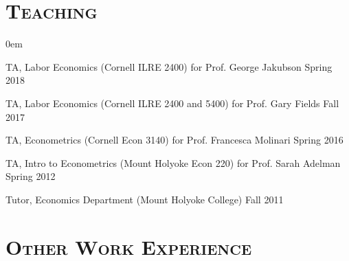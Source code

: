 \documentclass[10pt,letterpaper]{article}
\renewenvironment{itemize}{
  \begin{list}{}{
    \setlength{\leftmargin}{1.5em}
    \setlength{\itemsep}{0.25em}
    \setlength{\parskip}{0pt}
    \setlength{\parsep}{0.25em}
  }
}{
  \end{list}
}
\begin{document}
\section*{\scshape Teaching}
\begin{itemize} 
\itemsep0em
  \item TA, Labor Economics (Cornell ILRE 2400) for Prof. George Jakubson \hfill Spring 2018
  \item TA, Labor Economics (Cornell ILRE 2400 and 5400) for Prof. Gary Fields \hfill Fall 2017
  \item TA, Econometrics (Cornell Econ 3140) for Prof. Francesca Molinari \hfill Spring 2016
  \item TA, Intro to Econometrics (Mount Holyoke Econ 220) for Prof. Sarah Adelman \hfill Spring 2012
   \item Tutor, Economics Department (Mount Holyoke College) \hfill Fall 2011
\end{itemize}





\section*{\scshape Other Work Experience}
\end{document}

